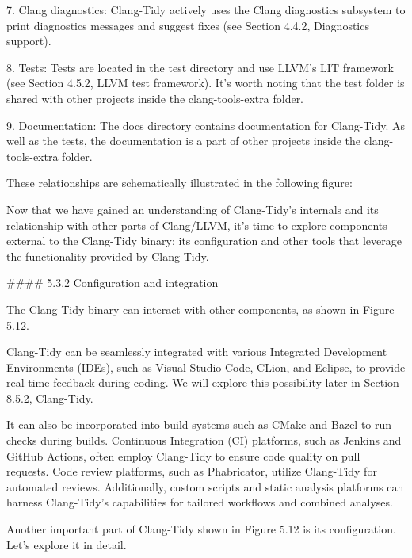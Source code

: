 \begin{markdown}
7. Clang diagnostics: Clang-Tidy actively uses the Clang diagnostics subsystem to print diagnostics messages and suggest fixes (see Section 4.4.2, Diagnostics support).

8. Tests: Tests are located in the test directory and use LLVM's LIT framework (see Section 4.5.2, LLVM test framework). It's worth noting that the test folder is shared with other projects inside the clang-tools-extra folder.

9. Documentation: The docs directory contains documentation for Clang-Tidy. As well as the tests, the documentation is a part of other projects inside the clang-tools-extra folder.

These relationships are schematically illustrated in the following figure:


Now that we have gained an understanding of Clang-Tidy’s internals and its relationship with other parts of Clang/LLVM, it’s time to explore components external to the Clang-Tidy binary: its configuration and other tools that leverage the functionality provided by Clang-Tidy.

#### 5.3.2 Configuration and integration

The Clang-Tidy binary can interact with other components, as shown in Figure 5.12.


Clang-Tidy can be seamlessly integrated with various Integrated Development Environments (IDEs), such as Visual Studio Code, CLion, and Eclipse, to provide real-time feedback during coding. We will explore this possibility later in Section 8.5.2, Clang-Tidy.

It can also be incorporated into build systems such as CMake and Bazel to run checks during builds. Continuous Integration (CI) platforms, such as Jenkins and GitHub Actions, often employ Clang-Tidy to ensure code quality on pull requests. Code review platforms, such as Phabricator, utilize Clang-Tidy for automated reviews. Additionally, custom scripts and static analysis platforms can harness Clang-Tidy’s capabilities for tailored workflows and combined analyses.

Another important part of Clang-Tidy shown in Figure 5.12 is its configuration. Let’s explore it in detail.


\end{markdown}
